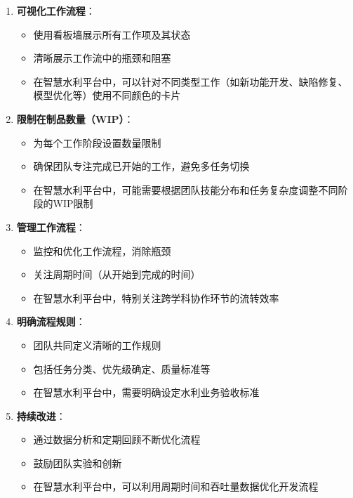\begin{enumerate}
\def\labelenumi{\arabic{enumi}.}
\tightlist
\item
  \textbf{可视化工作流程}：

  \begin{itemize}
  \tightlist
  \item
    使用看板墙展示所有工作项及其状态
  \item
    清晰展示工作流中的瓶颈和阻塞
  \item
    在智慧水利平台中，可以针对不同类型工作（如新功能开发、缺陷修复、模型优化等）使用不同颜色的卡片
  \end{itemize}
\item
  \textbf{限制在制品数量（WIP）}：

  \begin{itemize}
  \tightlist
  \item
    为每个工作阶段设置数量限制
  \item
    确保团队专注完成已开始的工作，避免多任务切换
  \item
    在智慧水利平台中，可能需要根据团队技能分布和任务复杂度调整不同阶段的WIP限制
  \end{itemize}
\item
  \textbf{管理工作流程}：

  \begin{itemize}
  \tightlist
  \item
    监控和优化工作流程，消除瓶颈
  \item
    关注周期时间（从开始到完成的时间）
  \item
    在智慧水利平台中，特别关注跨学科协作环节的流转效率
  \end{itemize}
\item
  \textbf{明确流程规则}：

  \begin{itemize}
  \tightlist
  \item
    团队共同定义清晰的工作规则
  \item
    包括任务分类、优先级确定、质量标准等
  \item
    在智慧水利平台中，需要明确设定水利业务验收标准
  \end{itemize}
\item
  \textbf{持续改进}：

  \begin{itemize}
  \tightlist
  \item
    通过数据分析和定期回顾不断优化流程
  \item
    鼓励团队实验和创新
  \item
    在智慧水利平台中，可以利用周期时间和吞吐量数据优化开发流程
  \end{itemize}
\end{enumerate}

